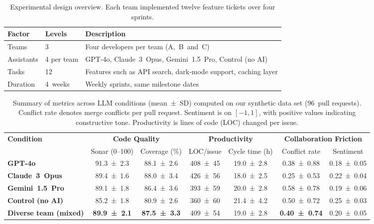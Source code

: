 \documentclass[conference]{IEEEtran}
\begin{document}
\begin{table}[t]
\centering
\caption{Experimental design overview.  Each team implemented twelve feature tickets over four sprints.}
\label{tab:design}
\begin{tabular}{p{2.5cm}p{2cm}p{3cm}}
\toprule
\textbf{Factor} & \textbf{Levels} & \textbf{Description}\\
\midrule
Teams & 3 & Four developers per team (A, B and C) \\
Assistants & 4 per team & GPT‑4o, Claude 3 Opus, Gemini 1.5 Pro, Control (no AI) \\
Tasks & 12 & Features such as API search, dark‑mode support, caching layer \\
Duration & 4 weeks & Weekly sprints, same milestone dates \\
\bottomrule
\end{tabular}
\end{table}

\begin{table*}[t]
\centering
\caption{Summary of metrics across LLM conditions (mean ± SD) computed on our synthetic data set (96 pull requests).  Conflict rate denotes merge conflicts per pull request.  Sentiment is on $[-1,1]$, with positive values indicating constructive tone.  Productivity is lines of code (LOC) changed per issue.}
\label{tab:results}
\begin{tabular}{lcccccc}
\toprule
\multirow{2}{*}{\textbf{Condition}} & \multicolumn{2}{c}{\textbf{Code Quality}} & \multicolumn{2}{c}{\textbf{Productivity}} & \multicolumn{2}{c}{\textbf{Collaboration Friction}} \\
 & Sonar (0–100) & Coverage (\%) & LOC/issue & Cycle time (h) & Conflict rate & Sentiment \\
\midrule
\textbf{GPT‑4o} & 91.3 ± 2.3 & 88.1 ± 2.6 & 408 ± 45 & 19.0 ± 2.8 & 0.38 ± 0.88 & 0.18 ± 0.05 \\
\textbf{Claude 3 Opus} & 89.4 ± 1.6 & 88.0 ± 3.4 & 426 ± 56 & 18.0 ± 2.5 & 0.25 ± 0.53 & 0.22 ± 0.04 \\
\textbf{Gemini 1.5 Pro} & 89.1 ± 1.8 & 86.4 ± 3.6 & 393 ± 59 & 20.0 ± 2.8 & 0.58 ± 0.78 & 0.19 ± 0.06 \\
\textbf{Control (no AI)} & 85.2 ± 1.8 & 80.9 ± 2.6 & 360 ± 60 & 21.4 ± 4.2 & 0.50 ± 0.72 & 0.25 ± 0.03 \\
\midrule
\textbf{Diverse team (mixed)} & \textbf{89.9 ± 2.1} & \textbf{87.5 ± 3.3} & 409 ± 54 & 19.0 ± 2.8 & \textbf{0.40 ± 0.74} & 0.20 ± 0.05 \\
\bottomrule
\end{tabular}
\end{table*}
\end{document}
